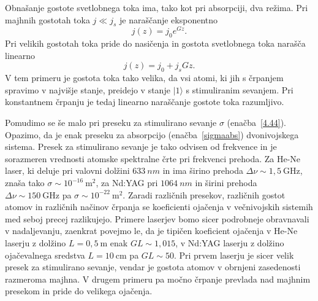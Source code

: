 Obnašanje gostote svetlobnega toka ima, tako kot pri absorpciji, dva režima. 
Pri majhnih gostotah toka $j\ll j_{s}$ je naraščanje eksponentno 
\begin{equation}
j(z)=j_{0}e^{Gz}.
\label{4.45}
\end{equation}
Pri velikih gostotah toka pride do nasičenja in gostota svetlobnega
toka narašča linearno
\begin{equation}
j(z)=j_{0}+j_{s}Gz.
\label{4.46}
\end{equation}
V tem primeru je gostota toka tako velika, da vsi atomi, ki jih
s črpanjem spravimo v najvišje stanje, preidejo v stanje $|1\rangle$
s stimuliranim sevanjem. Pri konstantnem črpanju je tedaj 
linearno naraščanje gostote toka razumljivo. 

Pomudimo se še malo pri preseku za stimulirano sevanje $\sigma$
 (enačba~\ref{4.44}). Opazimo, da je enak preseku za
absorpcijo (enačba~\ref{sigmaabs}) dvonivojskega sistema. 
Presek za stimulirano
sevanje je tako odvisen od frekvence in je sorazmeren vrednosti atomske spektralne 
črte pri frekvenci prehoda. Za He-Ne laser, 
ki deluje pri valovni dolžini $633~\si{nm}$ in ima 
širino prehoda $\Delta \nu \sim 1,5~\si{\giga\hertz}$, znaša tako  
$\sigma \sim 10^{-16}~\si{\metre}^2$, 
za Nd:YAG pri $1064~\si{nm}$ in širini prehoda 
$\Delta \nu \sim 150~\si{\giga\hertz}$ pa  $\sigma \sim 10^{-22}~\si{\metre}^2$.
Zaradi različnih presekov, različnih gostot atomov in različnih načinov črpanja se 
koeficienti ojačenja v večnivojskih sistemih med seboj precej razlikujejo. Primere 
laserjev bomo sicer podrobneje obravnavali v nadaljevanju, zaenkrat povejmo 
le, da je tipičen koeficient ojačenja v He-Ne laserju z dolžino $L = 0,5~\si{\metre}$
enak $GL \sim 1,015$, v Nd:YAG laserju z dolžino ojačevalnega sredstva 
$L = 10~\si{\centi\metre}$ pa $GL \sim 50$. Pri prvem laserju je sicer 
velik presek za stimulirano sevanje, vendar 
je gostota atomov v obrnjeni zasedenosti razmeroma majhna. V drugem primeru pa močno 
črpanje prevlada nad majhnim presekom in pride do velikega ojačenja.

